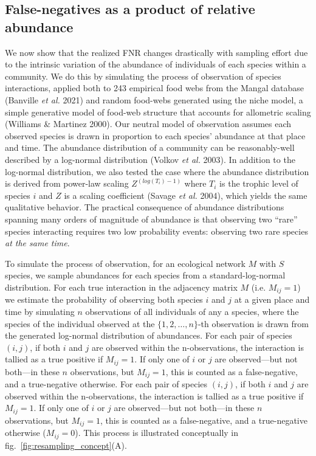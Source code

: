 \documentclass[11pt]{article}
\begin{document}
\hypertarget{false-negatives-as-a-product-of-relative-abundance}{%
\subsection{False-negatives as a product of relative
abundance}\label{false-negatives-as-a-product-of-relative-abundance}}

We now show that the realized FNR changes drastically with sampling
effort due to the intrinsic variation of the abundance of individuals of
each species within a community. We do this by simulating the process of
observation of species interactions, applied both to 243 empirical food
webs from the Mangal database (Banville \emph{et al.} 2021) and random
food-webs generated using the niche model, a simple generative model of
food-web structure that accounts for allometric scaling (Williams \&
Martinez 2000). Our neutral model of observation assumes each observed
species is drawn in proportion to each species' abundance at that place
and time. The abundance distribution of a community can be
reasonably-well described by a log-normal distribution (Volkov \emph{et
al.} 2003). In addition to the log-normal distribution, we also tested
the case where the abundance distribution is derived from power-law
scaling \(Z^{(log(T_i)-1)}\) where \(T_i\) is the trophic level of
species \(i\) and \(Z\) is a scaling coefficient (Savage \emph{et al.}
2004), which yields the same qualitative behavior. The practical
consequence of abundance distributions spanning many orders of magnitude
of abundance is that observing two ``rare'' species interacting requires
two low probability events: observing two rare species \emph{at the same
time}.

To simulate the process of observation, for an ecological network \(M\)
with \(S\) species, we sample abundances for each species from a
standard-log-normal distribution. For each true interaction in the
adjacency matrix \(M\) (i.e. \(M_{ij}=1\)) we estimate the probability
of observing both species \(i\) and \(j\) at a given place and time by
simulating \(n\) observations of all individuals of any a species, where
the species of the individual observed at the \(\{1,2,\dots,n\}\)-th
observation is drawn from the generated log-normal distribution of
abundances. For each pair of species \((i,j)\), if both \(i\) and \(j\)
are observed within the n-observations, the interaction is tallied as a
true positive if \(M_{ij}=1\). If only one of \(i\) or \(j\) are
observed---but not both---in these \(n\) observations, but \(M_{ij}=1\),
this is counted as a false-negative, and a true-negative otherwise. For
each pair of species \((i,j)\), if both \(i\) and \(j\) are observed
within the n-observations, the interaction is tallied as a true positive
if \(M_{ij}=1\). If only one of \(i\) or \(j\) are observed---but not
both---in these \(n\) observations, but \(M_{ij}=1\), this is counted as
a false-negative, and a true-negative otherwise (\(M_{ij} = 0\)). This
process is illustrated conceptually in
fig.~\ref{fig:resampling_concept}(A).
\end{document}

